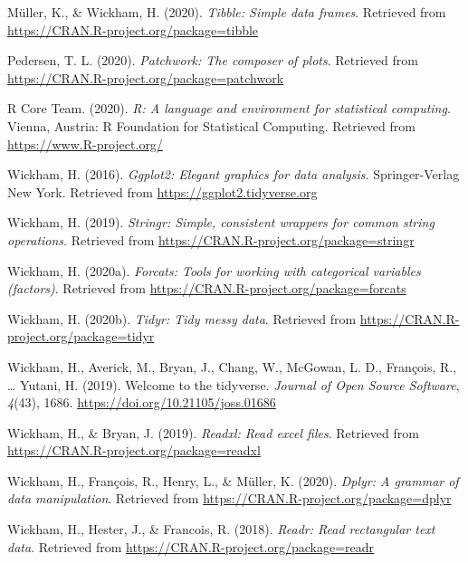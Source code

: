 \documentclass[
  english,
  man]{apa6}
\begin{document}
\leavevmode\hypertarget{ref-R-tibble}{}%
Müller, K., \& Wickham, H. (2020). \emph{Tibble: Simple data frames}. Retrieved from \url{https://CRAN.R-project.org/package=tibble}

\leavevmode\hypertarget{ref-R-patchwork}{}%
Pedersen, T. L. (2020). \emph{Patchwork: The composer of plots}. Retrieved from \url{https://CRAN.R-project.org/package=patchwork}

\leavevmode\hypertarget{ref-R-base}{}%
R Core Team. (2020). \emph{R: A language and environment for statistical computing}. Vienna, Austria: R Foundation for Statistical Computing. Retrieved from \url{https://www.R-project.org/}

\leavevmode\hypertarget{ref-R-ggplot2}{}%
Wickham, H. (2016). \emph{Ggplot2: Elegant graphics for data analysis}. Springer-Verlag New York. Retrieved from \url{https://ggplot2.tidyverse.org}

\leavevmode\hypertarget{ref-R-stringr}{}%
Wickham, H. (2019). \emph{Stringr: Simple, consistent wrappers for common string operations}. Retrieved from \url{https://CRAN.R-project.org/package=stringr}

\leavevmode\hypertarget{ref-R-forcats}{}%
Wickham, H. (2020a). \emph{Forcats: Tools for working with categorical variables (factors)}. Retrieved from \url{https://CRAN.R-project.org/package=forcats}

\leavevmode\hypertarget{ref-R-tidyr}{}%
Wickham, H. (2020b). \emph{Tidyr: Tidy messy data}. Retrieved from \url{https://CRAN.R-project.org/package=tidyr}

\leavevmode\hypertarget{ref-R-tidyverse}{}%
Wickham, H., Averick, M., Bryan, J., Chang, W., McGowan, L. D., François, R., \ldots{} Yutani, H. (2019). Welcome to the tidyverse. \emph{Journal of Open Source Software}, \emph{4}(43), 1686. \url{https://doi.org/10.21105/joss.01686}

\leavevmode\hypertarget{ref-R-readxl}{}%
Wickham, H., \& Bryan, J. (2019). \emph{Readxl: Read excel files}. Retrieved from \url{https://CRAN.R-project.org/package=readxl}

\leavevmode\hypertarget{ref-R-dplyr}{}%
Wickham, H., François, R., Henry, L., \& Müller, K. (2020). \emph{Dplyr: A grammar of data manipulation}. Retrieved from \url{https://CRAN.R-project.org/package=dplyr}

\leavevmode\hypertarget{ref-R-readr}{}%
Wickham, H., Hester, J., \& Francois, R. (2018). \emph{Readr: Read rectangular text data}. Retrieved from \url{https://CRAN.R-project.org/package=readr}
\end{document}
